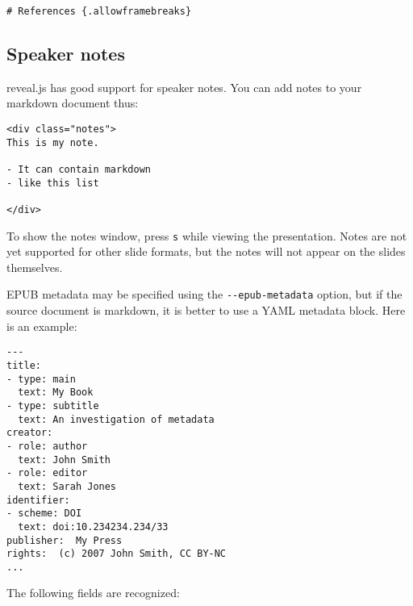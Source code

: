 \documentclass[]{article}
\begin{document}
\begin{verbatim}
# References {.allowframebreaks}
\end{verbatim}

\subsection{Speaker notes}\label{speaker-notes}

reveal.js has good support for speaker notes. You can add notes to your
markdown document thus:

\begin{verbatim}
<div class="notes">
This is my note.

- It can contain markdown
- like this list

</div>
\end{verbatim}

To show the notes window, press \texttt{s} while viewing the
presentation. Notes are not yet supported for other slide formats, but
the notes will not appear on the slides themselves.


EPUB metadata may be specified using the \texttt{-{}-epub-metadata}
option, but if the source document is markdown, it is better to use a
YAML metadata block. Here is an example:

\begin{verbatim}
---
title:
- type: main
  text: My Book
- type: subtitle
  text: An investigation of metadata
creator:
- role: author
  text: John Smith
- role: editor
  text: Sarah Jones
identifier:
- scheme: DOI
  text: doi:10.234234.234/33
publisher:  My Press
rights:  (c) 2007 John Smith, CC BY-NC
...
\end{verbatim}

The following fields are recognized:
\end{document}
